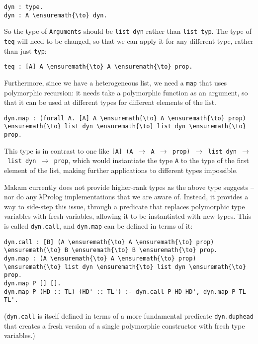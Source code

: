 \begin{verbatim}
dyn : type.
dyn : A \ensuremath{\to} dyn.
\end{verbatim}

So the type of \texttt{Arguments} should be \texttt{list\ dyn} rather
than \texttt{list\ typ}. The type of \texttt{teq} will need to be
changed, so that we can apply it for any different type, rather than
just \texttt{typ}:

\begin{verbatim}
teq : [A] A \ensuremath{\to} A \ensuremath{\to} prop.
\end{verbatim}

Furthermore, since we have a heterogeneous list, we need a \texttt{map}
that uses polymorphic recursion: it needs take a polymorphic function as
an argument, so that it can be used at different types for different
elements of the list.

\begin{verbatim}
dyn.map : (forall A. [A] A \ensuremath{\to} A \ensuremath{\to} prop) \ensuremath{\to} list dyn \ensuremath{\to} list dyn \ensuremath{\to} prop.
\end{verbatim}

This type is in contrast to one like
\texttt{{[}A{]}\ (A\ \ensuremath{\to}\ A\ \ensuremath{\to}\ prop)\ \ensuremath{\to}\ list\ dyn\ \ensuremath{\to}\ list\ dyn\ \ensuremath{\to}\ prop},
which would instantiate the type \texttt{A} to the type of the first
element of the list, making further applications to different types
impossible.

Makam currently does not provide higher-rank types as the above type
suggests -- nor do any \foreignlanguage{greek}{λ}Prolog implementations that we are aware of.
Instead, it provides a way to side-step this issue, through a predicate
that replaces polymorphic type variables with fresh variables, allowing
it to be instantiated with new types. This is called \texttt{dyn.call},
and \texttt{dyn.map} can be defined in terms of it:

\begin{verbatim}
dyn.call : [B] (A \ensuremath{\to} A \ensuremath{\to} prop) \ensuremath{\to} B \ensuremath{\to} B \ensuremath{\to} prop.
dyn.map : (A \ensuremath{\to} A \ensuremath{\to} prop) \ensuremath{\to} list dyn \ensuremath{\to} list dyn \ensuremath{\to} prop.
dyn.map P [] [].
dyn.map P (HD :: TL) (HD' :: TL') :- dyn.call P HD HD', dyn.map P TL TL'.
\end{verbatim}

(\texttt{dyn.call} is itself defined in terms of a more fundamental
predicate \texttt{dyn.duphead} that creates a fresh version of a single
polymorphic constructor with fresh type variables.)

